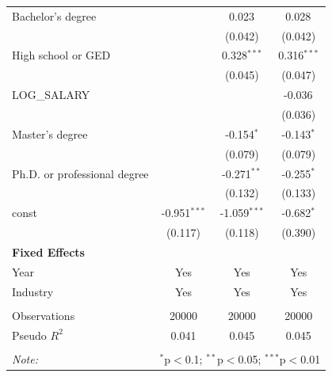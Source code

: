 \begin{table}[!htbp]
\begin{tabular}{@{\extracolsep{5pt}}lccc}
 Bachelor's degree & & 0.023$^{}$ & 0.028$^{}$ \\
& & (0.042) & (0.042) \\
 High school or GED & & 0.328$^{***}$ & 0.316$^{***}$ \\
& & (0.045) & (0.047) \\
 LOG_SALARY & & & -0.036$^{}$ \\
& & & (0.036) \\
 Master's degree & & -0.154$^{*}$ & -0.143$^{*}$ \\
& & (0.079) & (0.079) \\
 Ph.D. or professional degree & & -0.271$^{**}$ & -0.255$^{*}$ \\
& & (0.132) & (0.133) \\
 const & -0.951$^{***}$ & -1.059$^{***}$ & -0.682$^{*}$ \\
& (0.117) & (0.118) & (0.390) \\
 \textbf{Fixed Effects} &  &  &  \\
 Year & Yes & Yes & Yes \\
 Industry & Yes & Yes & Yes \\
\hline \\[-1.8ex]
 Observations & 20000 & 20000 & 20000 \\
 Pseudo $R^2$ & 0.041 & 0.045 & 0.045 \\
\hline
\hline \\[-1.8ex]
\textit{Note:} & \multicolumn{3}{r}{$^{*}$p$<$0.1; $^{**}$p$<$0.05; $^{***}$p$<$0.01} \\
\end{tabular}
\end{table}
